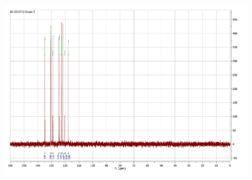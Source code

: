 \documentclass[fleqn,11pt]{SelfArx}
\begin{document}
	{
		\begin{minipage}{0.9\textheight}
			\centering
			\includegraphics[height=0.65\textheight]{RMN/DEPT135.pdf}
			\label{DEPT}
		\end{minipage}
	}
	
\end{document}
